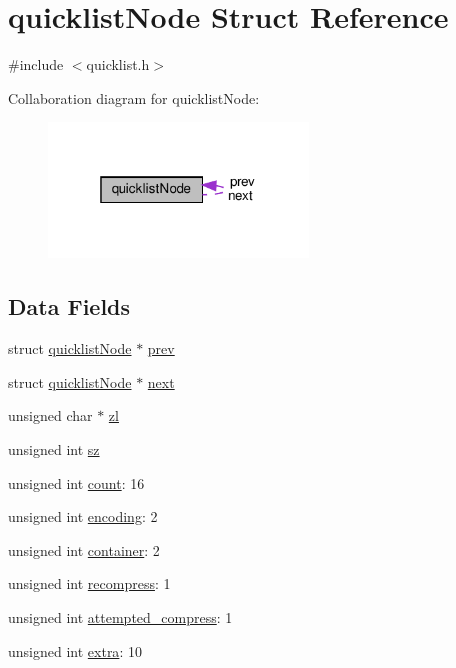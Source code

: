 \hypertarget{structquicklist_node}{}\section{quicklist\+Node Struct Reference}
\label{structquicklist_node}


{\ttfamily \#include $<$quicklist.\+h$>$}



Collaboration diagram for quicklist\+Node\+:
\nopagebreak
\begin{figure}[H]
\begin{center}
\leavevmode
\includegraphics[width=196pt]{structquicklist_node__coll__graph}
\end{center}
\end{figure}
\subsection*{Data Fields}
\begin{DoxyCompactItemize}
\item 
struct \hyperlink{structquicklist_node}{quicklist\+Node} $\ast$ \hyperlink{structquicklist_node_abdcd96580045a4aa2d38c11a4671ed8d}{prev}
\item 
struct \hyperlink{structquicklist_node}{quicklist\+Node} $\ast$ \hyperlink{structquicklist_node_aa4be5244c2097b8fc8bdf053a0793ac8}{next}
\item 
unsigned char $\ast$ \hyperlink{structquicklist_node_a1ae48f85ded0fe46acd8864ac807f6b8}{zl}
\item 
unsigned int \hyperlink{structquicklist_node_a2c1bd10d4bbc82d2d6c052c5842c0c8c}{sz}
\item 
unsigned int \hyperlink{structquicklist_node_a16ff2d8e15ade4948398b0aeb80124a8}{count}\+: 16
\item 
unsigned int \hyperlink{structquicklist_node_a541253f13be71f2a40d23f98d3ac6d7d}{encoding}\+: 2
\item 
unsigned int \hyperlink{structquicklist_node_a70f05801a591a8b37f9bb47e3bc5c8b5}{container}\+: 2
\item 
unsigned int \hyperlink{structquicklist_node_a614856eb02cf76c6e187226f760c7509}{recompress}\+: 1
\item 
unsigned int \hyperlink{structquicklist_node_a53fe211757060122aa7061b7d6bfcb38}{attempted\+\_\+compress}\+: 1
\item 
unsigned int \hyperlink{structquicklist_node_a660ceaa22bec21d59654a14bc0fde76e}{extra}\+: 10
\end{DoxyCompactItemize}


